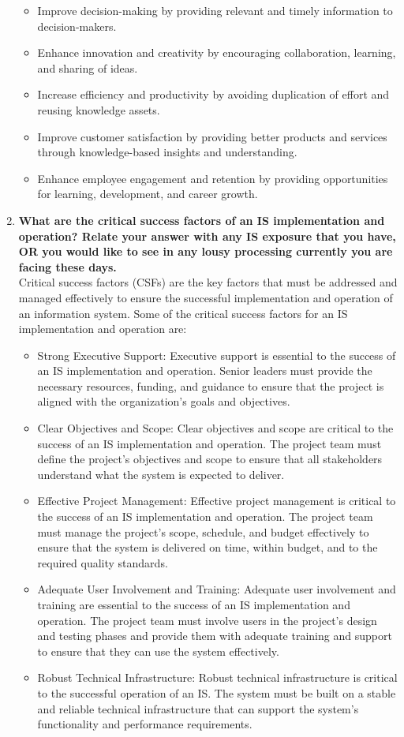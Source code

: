 \documentclass[12pt]{article}
\begin{document}
\begin{enumerate}
\begin{itemize}
\item Improve decision-making by providing relevant and timely information to decision-makers.
\item Enhance innovation and creativity by encouraging collaboration, learning, and sharing of ideas.
\item Increase efficiency and productivity by avoiding duplication of effort and reusing knowledge assets.
\item Improve customer satisfaction by providing better products and services through knowledge-based insights and understanding.
\item Enhance employee engagement and retention by providing opportunities for learning, development, and career growth.
\end{itemize}
\item{\bfseries What are the critical success factors of an IS implementation and operation? Relate your answer with any IS exposure that you have, OR you would like to see in any lousy processing currently you are facing these days.\\}
Critical success factors (CSFs) are the key factors that must be addressed and managed effectively to ensure the successful implementation and operation of an information system. Some of the critical success factors for an IS implementation and operation are:
\begin{itemize}
    \item Strong Executive Support: Executive support is essential to the success of an IS implementation and operation. Senior leaders must provide the necessary resources, funding, and guidance to ensure that the project is aligned with the organization's goals and objectives.
    \item Clear Objectives and Scope: Clear objectives and scope are critical to the success of an IS implementation and operation. The project team must define the project's objectives and scope to ensure that all stakeholders understand what the system is expected to deliver.
    \item Effective Project Management: Effective project management is critical to the success of an IS implementation and operation. The project team must manage the project's scope, schedule, and budget effectively to ensure that the system is delivered on time, within budget, and to the required quality standards.
\item  Adequate User Involvement and Training: Adequate user involvement and training are essential to the success of an IS implementation and operation. The project team must involve users in the project's design and testing phases and provide them with adequate training and support to ensure that they can use the system effectively.
\item  Robust Technical Infrastructure: Robust technical infrastructure is critical to the successful operation of an IS. The system must be built on a stable and reliable technical infrastructure that can support the system's functionality and performance requirements.
\end{itemize}


\end{enumerate}
\end{document}
